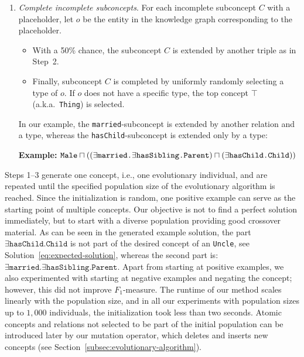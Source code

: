 \begin{enumerate}
		\medskip
		
	    \textbf{Example:} $\texttt{Male} \sqcap (\exists \texttt{married} \ldots  \sqcap \exists \texttt{hasChild} \ldots)$
	    
	    \medskip
	    
	    \item\label{item3-rw} \textit{Complete incomplete subconcepts}.  For each incomplete subconcept $C$ with a placeholder, let $o$ be the entity in the knowledge graph corresponding to the placeholder.
	    \begin{itemize}[noitemsep,topsep=0pt]
	        \item With a 50\% chance, the subconcept $C$ is extended by another triple as in Step~2.
	        \item Finally, subconcept $C$ is completed by uniformly randomly selecting a type of $o$. If $o$ does not have a specific type, the top concept $\top$ (a.k.a.\ \texttt{Thing}) is selected.
	    \end{itemize}
	    
	    In our example, the \texttt{married}-subconcept is extended by another relation and a type, whereas the \texttt{hasChild}-subconcept is extended only by a type:
	    
		\medskip
		
		\textbf{Example:} $\texttt{Male} \sqcap ((\exists \texttt{married.}\exists \texttt{hasSibling.Parent})  \sqcap\\ (\exists \texttt{hasChild.Child}))$
\end{enumerate}

Steps 1--3 generate one concept, i.e., one evolutionary individual, and are repeated until the specified population size of the evolutionary algorithm is reached. Since the initialization is random, one positive example can serve as the starting point of multiple concepts. Our objective is not to find a perfect solution immediately, but to start with a diverse population providing good crossover material. As can be seen in the generated example solution, the part $\exists \texttt{hasChild.Child}$ is not part of the desired concept of an \texttt{Uncle}, see Solution~\eqref{eq:expected-solution}, whereas the second part is: $\exists \texttt{married.}\exists \texttt{hasSibling.Parent}$. Apart from starting at positive examples, we also experimented with starting at negative examples and negating the concept; however, this did not improve $F_1$-measure. The runtime of our method scales linearly with the population size, and in all our experiments with population sizes up to $1,000$ individuals, the initialization took less than two seconds.  Atomic concepts and relations not selected to be part of the initial population can be introduced later by our mutation operator, which deletes and inserts new concepts (see Section~\ref{subsec:evolutionary-algorithm}).

